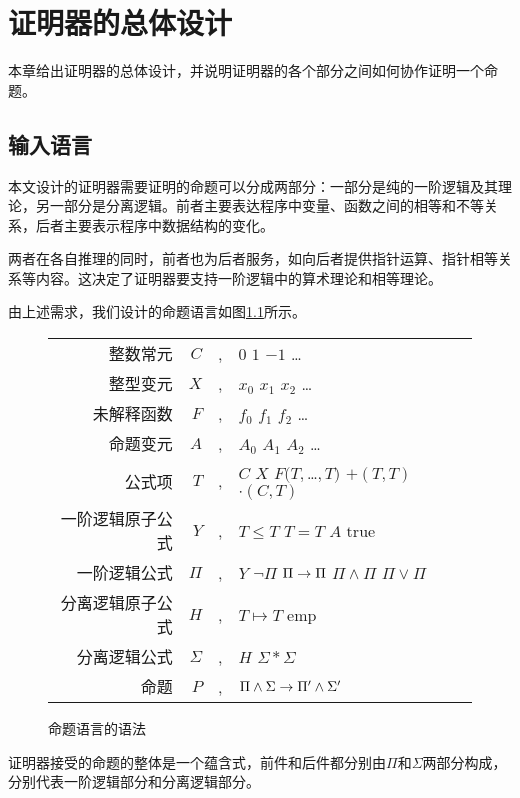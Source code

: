 \chapter{证明器的总体设计}
\label{chap:struct}
本章给出证明器的总体设计，并说明证明器的各个部分之间如何协作证明一个命题。

\section{输入语言}
本文设计的证明器需要证明的命题可以分成两部分：一部分是纯的一阶逻辑及其理论，另一部分是分离逻辑。前者主要表达程序中变量、函数之间的相等和不等关系，后者主要表示程序中数据结构的变化。

两者在各自推理的同时，前者也为后者服务，如向后者提供指针运算、指针相等关系等内容。这决定了证明器要支持一阶逻辑中的算术理论和相等理论。

由上述需求，我们设计的命题语言如图\ref{struct:syntax}所示。

\begin{figure}[!htbp]
  \centering
  \begin{tabular}{rrcl}
    整数常元 & $C$ & \sep & $0$ \deli{} $1$ \deli{} $-1$ \deli{} \ldots \\
    整型变元 & $X$ & \sep & $x_0$ \deli{} $x_1$ \deli{} $x_2$ \deli{} \ldots \\
    未解释函数 & $F$ & \sep & $f_0$ \deli{} $f_1$ \deli{} $f_2$ \deli{} \ldots \\
    命题变元 & $A$ & \sep & $A_0$ \deli{} $A_1$ \deli{} $A_2$ \deli{} \ldots \\
    公式项  & $T$ & \sep & $C$ \deli{} $X$ \deli{} $F(T,$\ldots$,T)$ \deli{} $+(T, T)$ \deli{} $\cdot(C,T)$ \\
    一阶逻辑原子公式 & $Y$ & \sep{} & $T \le T$ \deli{} $T = T$ \deli{} $A$ \deli{} $\mathrm{true}$ \\
    一阶逻辑公式 & $\Pi$ & \sep{} & $Y$ \deli{}  $\lnot \Pi$ \deli{} $\Pi \rightarrow \Pi$ \deli{} $\Pi \land \Pi$ \deli{} $\Pi \lor \Pi$ \\
    分离逻辑原子公式 & $H$ & \sep{} & $T \mapsto T$ \deli{} $\mathrm{emp}$ \\
    分离逻辑公式 & $\Sigma$ & \sep{} & $H$ \deli{} $\Sigma \ast \Sigma$ \\
    命题 & $P$ & \sep & $ \Pi \land \Sigma \rightarrow \Pi' \land \Sigma' $
  \end{tabular}
  \caption{命题语言的语法}
  \label{struct:syntax}
\end{figure}

证明器接受的命题的整体是一个蕴含式，前件和后件都分别由$\Pi$和$\Sigma$两部分构成，分别代表一阶逻辑部分和分离逻辑部分。

